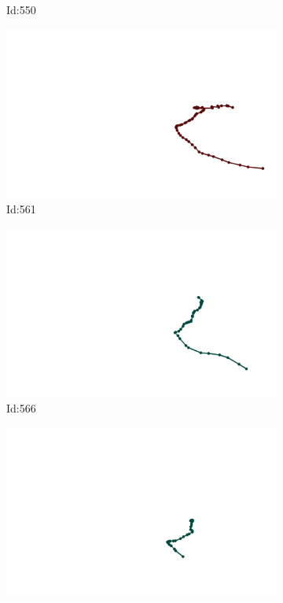 \documentclass[12pt,twoside]{report}
\begin{document}
\begin{figure}
\begin{subfigure}[b]{0.20\textwidth}
\caption{Id:550}
\end{subfigure}
\begin{subfigure}[b]{0.20\textwidth}
\centering
\includegraphics[width=\textwidth]{../trajectories/561.png}
\caption{Id:561}
\end{subfigure}
\begin{subfigure}[b]{0.20\textwidth}
\centering
\includegraphics[width=\textwidth]{../trajectories/566.png}
\caption{Id:566}
\end{subfigure}
\begin{subfigure}[b]{0.20\textwidth}
\centering
\includegraphics[width=\textwidth]{../trajectories/608.png}

\end{subfigure}
\end{figure}
\end{document}
